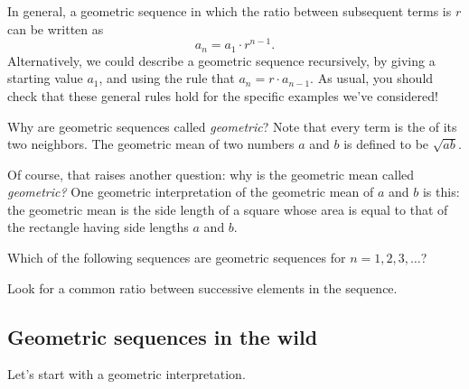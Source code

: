 \documentclass{ximera}
\begin{document}
In general, a geometric sequence in which the ratio between
subsequent terms is $r$ can be written as
\[
a_n = a_1 \cdot r^{n-1}.
\]
Alternatively, we could describe a geometric sequence
recursively, by giving a starting value $a_1$, and using the rule that
$a_{n} = r \cdot a_{n-1}$.  As usual, you should check that these general 
rules hold for the specific examples we've considered!

\begin{remark}
Why are geometric sequences called \textit{geometric}?  Note that
every term is the  of its two neighbors.  The
geometric mean of two numbers $a$ and $b$ is defined to be
$\sqrt{ab}$.

Of course, that raises another question: why is the geometric mean
called \textit{geometric?}  One geometric interpretation of the
geometric mean of $a$ and $b$ is this: the geometric mean is the side
length of a square whose area is equal to that of the rectangle having
side lengths $a$ and $b$.
\end{remark}

\begin{question}
  Which of the following sequences are geometric sequences for
  $n=1,2,3,\dots$?
  \begin{selectAll}
  \end{selectAll}
  \begin{hint}
    Look for a common ratio between successive elements in the sequence. 
  \end{hint}
\end{question}

\subsection{Geometric sequences in the wild}

Let's start with a geometric interpretation.
\end{document}
